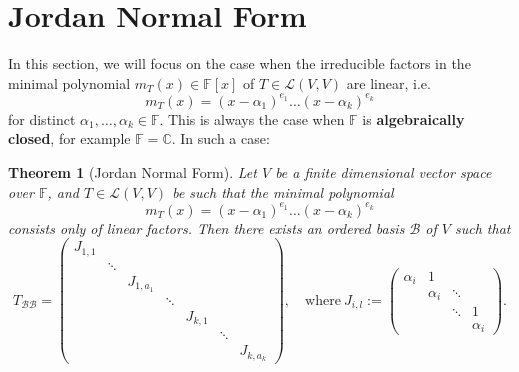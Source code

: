 \documentclass[12pt]{amsbook}
\newtheorem{theorem}{Theorem}[section]
\begin{document}
\section{Jordan Normal Form}
In this section, we will focus on the case when the irreducible factors in the minimal polynomial $m_T(x) \in \mathbb{F}[x]$ of 
$T \in \mathcal{L}(V,V)$ are linear, i.e.
$$m_T(x) = (x-\alpha_1)^{e_1} \dots (x - \alpha_k)^{e_k}$$
for distinct $\alpha_1, \dots, \alpha_k \in \mathbb{F}$.
This is always the case when $\mathbb{F}$ is {\bf algebraically closed}, for example $\mathbb{F} = \mathbb{C}$. In such a case:
\begin{theorem}[Jordan Normal Form]
Let $V$ be a finite dimensional vector space over $\mathbb{F}$, and $T \in \mathcal{L}(V,V)$ be such that the minimal polynomial
$$m_T(x) = (x-\alpha_1)^{e_1} \dots (x - \alpha_k)^{e_k}$$
consists only of linear factors. Then there exists an ordered basis $\mathcal{B}$ of $V$ such that 
    $$T_{\mathcal{B}\mathcal{B}} = \begin{pmatrix} J_{1,1} & & & & & \\
& \ddots & & & & & \\ 
& & J_{1,a_1} & & & & \\
& & & \ddots & & &\\
& & & & J_{k,1} & & \\
& & & & & \ddots & \\
& & & & & & J_{k,a_k}\end{pmatrix}, \quad \text{where}\ J_{i,l} := \begin{pmatrix} \alpha_i & 1 & & \\
 & \alpha_i & \ddots & \\
 &  & \ddots & 1 \\
 &  &  & \alpha_i \end{pmatrix}.
$$
\end{theorem}
\end{document}
